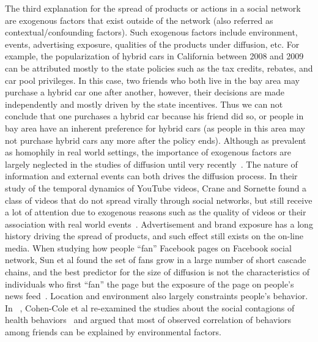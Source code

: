 \documentclass[phd,tocprelim]{cornell}
\begin{document}
The third explanation for the spread of products or actions in a social network are exogenous factors that exist outside of the network (also referred as contextual/confounding factors). Such exogenous factors include environment, events, advertising exposure, qualities of the products under diffusion, etc. For example, the popularization of hybrid cars in California between 2008 and 2009 can be attributed mostly to the state policies such as the tax credits, rebates, and car pool privileges. In this case, two friends who both live in the bay area may purchase a hybrid car one after another, however, their decisions are made independently and mostly driven by the state incentives. Thus we can not conclude that one purchases a hybrid car because his friend did so, or people in bay area have an inherent preference for hybrid cars (as people in this area may not purchase hybrid cars any more after the policy ends). Although as prevalent as homophily in real world settings, the importance of exogenous factors are largely neglected in the studies of diffusion until very recently~\cite{Aral-2012}. The nature of information and external events can both drives the diffusion process. In their study of the temporal dynamics of YouTube videos, Crane and Sornette found a class of videos that do not spread virally through social networks, but still receive a lot of attention due to exogenous reasons such as the quality of videos or their association with real world events~\cite{crane:2008}. Advertisement and brand exposure has a long history driving the spread of products, and such effect still exists on the on-line media. When studying how people ``fan'' Facebook pages on Facebook social network, Sun et al found the set of fans grow in a large number of short cascade chains, and the best predictor for the size of diffusion is not the characteristics of individuals who first ``fan'' the page but the exposure of the page on people's news feed~\cite{Sun-2009}. Location and environment also largely constraints people's behavior. In ~\cite{CohenCole-2008}, Cohen-Cole et al re-examined the studies about the social contagions of health behaviors~\cite{Christakis-2007,Christakis-2008,Fowler-2008} and argued that most of observed correlation of behaviors among friends can be explained by environmental factors. 
\end{document}
